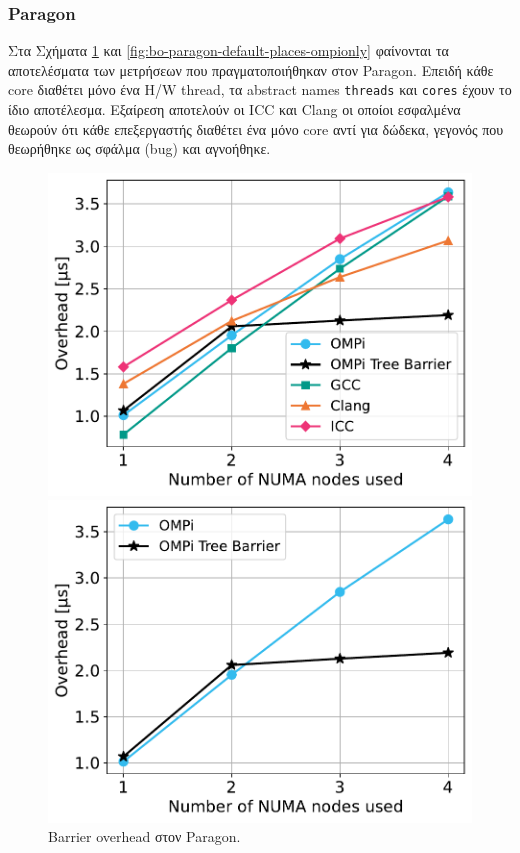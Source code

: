 \subsubsection{Paragon}
Στα Σχήματα \ref{fig:bo-paragon-default-places} και \ref{fig:bo-paragon-default-places-ompionly} φαίνονται τα αποτελέσματα των μετρήσεων που πραγματοποιήθηκαν στον Paragon. Επειδή κάθε core διαθέτει μόνο ένα H/W thread, τα abstract names \texttt{threads} και \texttt{cores} έχουν το ίδιο αποτέλεσμα. Εξαίρεση αποτελούν οι ICC και Clang οι οποίοι εσφαλμένα θεωρούν ότι κάθε επεξεργαστής διαθέτει ένα μόνο core αντί για δώδεκα, γεγονός που θεωρήθηκε ως σφάλμα (bug) και αγνοήθηκε.

\begin{figure}
    \centering
    \begin{minipage}{0.48\textwidth}
        \centering
        \includegraphics[width=1\textwidth]{Figures/paragon_epcc_20210825_132109/default-places_threads_close.pdf}
		\caption{Barrier overhead στον Paragon.}
		\label{fig:bo-paragon-default-places}
    \end{minipage}\hfill
    \begin{minipage}{0.48\textwidth}
        \centering
        \includegraphics[width=1\textwidth]{Figures/paragon_epcc_20210825_132109/ompi_default-places_threads_close.pdf}

\end{minipage}
\end{figure}
